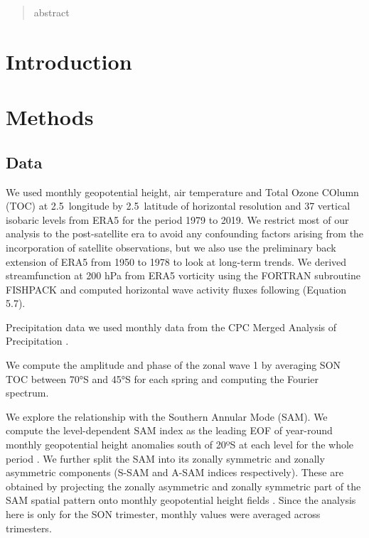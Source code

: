 \documentclass[smallextended]{svjour3}       %
\begin{document}
\begin{abstract}
abstract
\\
\keywords{
         \and
    }


\end{abstract}


\def\spacingset#1{\renewcommand{\baselinestretch}%
{#1}\small\normalsize} \spacingset{1}


\hypertarget{introduction}{%
\section{Introduction}\label{introduction}}

\hypertarget{methods}{%
\section{Methods}\label{methods}}

\hypertarget{data}{%
\subsection{Data}\label{data}}

We used monthly geopotential height, air temperature and Total Ozone COlumn (TOC) at 2.5\degree~longitude by 2.5\degree~latitude of horizontal resolution and 37 vertical isobaric levels from ERA5 \citep{era5} for the period 1979 to 2019. We restrict most of our analysis to the post-satellite era to avoid any confounding factors arising from the incorporation of satellite observations, but we also use the preliminary back extension of ERA5 from 1950 to 1978 \citep{era5be} to look at long-term trends. We derived streamfunction at 200 hPa from ERA5 vorticity using the FORTRAN subroutine FISHPACK \citep{fishpack} and computed horizontal wave activity fluxes following \citet{plumb1985} (Equation 5.7).

Precipitation data we used monthly data from the CPC Merged Analysis of Precipitation \citep{cmap}.

We compute the amplitude and phase of the zonal wave 1 by averaging SON TOC between 70°S and 45°S for each spring and computing the Fourier spectrum.

We explore the relationship with the Southern Annular Mode (SAM). We compute the level-dependent SAM index as the leading EOF of year-round monthly geopotential height anomalies south of 20ºS at each level for the whole period \citep{baldwin2009}. We further split the SAM into its zonally symmetric and zonally asymmetric components (S-SAM and A-SAM indices respectively). These are obtained by projecting the zonally asymmetric and zonally symmetric part of the SAM spatial pattern onto monthly geopotential height fields \citep{campitelli2021}. Since the analysis here is only for the SON trimester, monthly values were averaged across trimesters.
\end{document}
